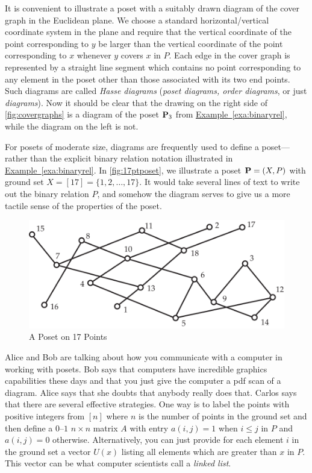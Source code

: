 It is convenient to illustrate a poset with a suitably drawn diagram
of the cover graph in the Euclidean plane.  We choose a standard
horizontal/vertical coordinate system in the plane and require that
the vertical coordinate of the point corresponding to $y$ be larger
than the vertical coordinate of the point corresponding to $x$
whenever $y$ covers $x$ in $P$. Each edge in the cover graph is
represented by a straight line segment which contains no point
corresponding to any element in the poset other than those associated
with its two end points.  Such diagrams are called \textit{Hasse
  diagrams} (\textit{poset diagrams, order diagrams}, or just
\textit{diagrams}).  Now it should be clear that the drawing on the
right side of \autoref{fig:covergraphs} is a diagram of the poset
$\mathbf{P}_3$ from \hyperref[exa:binaryrel]{Example~\ref*{exa:binaryrel}},
while the diagram on the left is not.

For posets of moderate size, diagrams are frequently used to define a poset---rather
than the explicit binary relation notation illustrated in \hyperref[exa:binaryrel]{Example~\ref*{exa:binaryrel}}.
In \autoref{fig:17ptposet}, we illustrate a poset $\mathbf{P}=(X,P)$ with ground set 
$X=[17]=\{1,2,\dots,17\}$.  It would take several lines of text to write out the
binary relation $P$, and somehow the diagram serves to give us a more tactile sense
of the properties of the poset. 

\begin{figure}
\begin{center}
\includegraphics*[scale=.4]{posets-figs/17ptposet.pdf}
\caption{A Poset on 17 Points}
\label{fig:17ptposet}
\end{center}
\end{figure}

\begin{remark}
Alice and Bob are talking about how you communicate with
a computer in working with posets.  Bob says that computers
have incredible graphics capabilities these days and that you
just give the computer a pdf scan of a diagram.  Alice says
that she doubts that anybody really does that.  Carlos says
that there are several effective strategies.  One way is to label 
the points with positive integers from $[n]$ where $n$ is the 
number of points in the ground set and then define a $0$--$1$
$n\times n$ matrix $A$ with entry $a(i,j)=1$ when $i\le j$ in $P$
and $a(i,j)=0$ otherwise.  Alternatively, you can just provide
for each element $i$ in the ground set a vector $U(x)$ listing all
elements which are greater than $x$ in $P$.  This vector can
be what computer scientists call a \textit{linked list}.
\end{remark}
 
